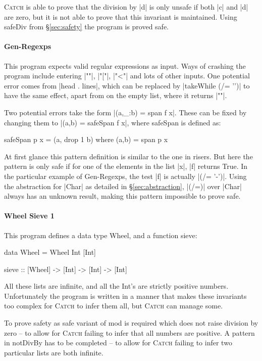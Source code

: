 \documentclass[preprint]{sigplanconf}
\newcommand{\C}[1]{\textsf{#1}}
\newcommand{\catch}{\textsc{Catch}}
\begin{document}
\catch{} is able to prove that the division by |d| is only unsafe if both |c| and |d| are zero, but it is not able to prove that this invariant is maintained. Using \C{safeDiv} from \S\ref{sec:safety} the program is proved safe.

\paragraph{Gen-Regexps}

This program expects valid regular expressions as input. Ways of crashing the program include entering |""|, |"["|, |"<"| and lots of other inputs. One potential error comes from |head . lines|, which can be replaced by |takeWhile (/= '\n')| to have the same effect, apart from on the empty list, where it returns |""|.

Two potential errors take the form |(a,_:b) = span f x|. These can be fixed by changing them to |(a,b) = safeSpan f x|, where \C{safeSpan} is defined as:

\begin{code}
safeSpan p x = (a, drop 1 b)
    where (a,b) = span p x
\end{code}

At first glance this pattern definition is similar to the one in \C{risers}. But here the pattern is only safe if for one of the elements in the list |x|, |f| returns True. In the particular example of Gen-Regexps, the test |f| is actually |(/= '-')|. Using the abstraction for |Char| as detailed in \S\ref{sec:abstraction}, |(/=)| over |Char| always has an unknown result, making this pattern impossible to prove safe.

\paragraph{Wheel Sieve 1}

This program defines a data type \C{Wheel}, and a function \C{sieve}:

\begin{code}
data Wheel = Wheel Int [Int]

sieve :: [Wheel] -> [Int] -> [Int] -> [Int]
\end{code}

All these lists are infinite, and all the Int's are strictly positive numbers. Unfortunately the program is written in a manner that makes these invariants too complex for \catch{} to infer them all, but \catch{} can manage some.

To prove safety as safe variant of \C{mod} is required which does not raise division by zero -- to allow for \catch{} failing to infer that all numbers are positive. A pattern in \C{notDivBy} has to be completed -- to allow for \catch{} failing to infer two particular lists are both infinite.
\end{document}
